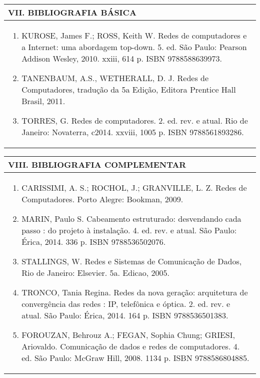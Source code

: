\documentclass[12pt]{article}
\begin{document}

\begin{longtable}{|L{1.025\textwidth}|} \hline
%
{\bf VII. BIBLIOGRAFIA BÁSICA} \\ \hline
\begin{enumerate}
%
\item  KUROSE, James F.; ROSS, Keith W. Redes de computadores e a Internet: uma abordagem top-down. 5. ed. São Paulo: Pearson Addison Wesley, 2010. xxiii, 614 p. ISBN 9788588639973.
\item TANENBAUM, A.S., WETHERALL, D. J. Redes de Computadores, tradução da 5a Edição, Editora Prentice Hall Brasil, 2011. 
\item  TORRES, G. Redes de computadores. 2. ed. rev. e atual. Rio de Janeiro: Novaterra,
c2014. xxviii, 1005 p. ISBN 9788561893286.
\end{enumerate}
 \\ \hline
\end{longtable}


\newpage

\begin{longtable}{|L{1.025\textwidth}|} \hline
%
{\bf VIII. BIBLIOGRAFIA COMPLEMENTAR} \\ \hline
\begin{enumerate}
\item CARISSIMI, A. S.; ROCHOL, J.; GRANVILLE, L. Z. Redes de Computadores. Porto Alegre: Bookman, 2009. 
\item MARIN, Paulo S. Cabeamento estruturado: desvendando cada passo : do projeto à instalação. 4. ed. rev. e atual. São Paulo: Érica, 2014. 336 p. ISBN 9788536502076.
\item  STALLINGS, W. Redes e Sistemas de Comunicação de Dados, Rio de Janeiro: Elsevier. 5a. Edicao, 2005.
\item TRONCO, Tania Regina. Redes da nova geração: arquitetura de convergência das redes :
IP, telefônica e óptica. 2. ed. rev. e atual. São Paulo: Érica, 2014. 164 p. ISBN
9788536501383.
\item FOROUZAN, Behrouz A.; FEGAN, Sophia Chung; GRIESI, Ariovaldo. Comunicação
de dados e redes de computadores. 4. ed. São Paulo: McGraw Hill, 2008. 1134 p. ISBN
9788586804885.


%
\end{enumerate}
 \\ \hline
\end{longtable}



\end{document}
